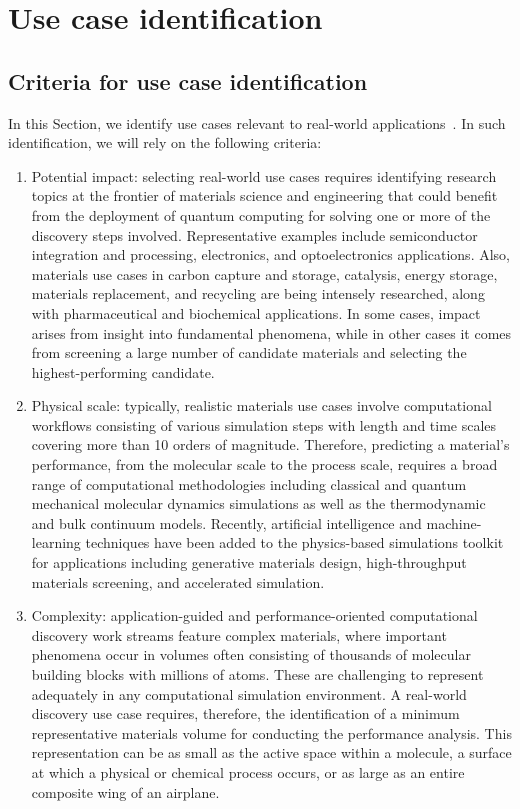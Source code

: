 \section{Use case identification\label{sec:UseCaseDiscovery}}

\subsection{Criteria for use case identification}

In this Section, we identify use cases relevant to real-world applications~\cite{2023arXiv230613126S}.
In such identification, we will rely on the following criteria:

\begin{enumerate}
\item
Potential impact: selecting real-world use cases requires identifying research topics at the frontier of materials science and engineering that could benefit from the deployment of quantum computing for solving one or more of the discovery steps involved. Representative examples include semiconductor integration and processing, electronics, and optoelectronics applications. Also, materials use cases in carbon capture and storage, catalysis, energy storage, materials replacement, and recycling are being intensely researched, along with pharmaceutical and biochemical applications. In some cases, impact arises from insight into fundamental phenomena, while in other cases it comes from screening a large number of candidate materials and selecting the highest-performing candidate.
\item
Physical scale: typically, realistic materials use cases involve computational workflows consisting of various simulation steps with length and time scales covering more than 10 orders of magnitude. Therefore, predicting a material’s performance, from the molecular scale to the process scale, requires a broad range of computational methodologies including classical and quantum mechanical molecular dynamics simulations as well as the thermodynamic and bulk continuum models. Recently, artificial intelligence and machine-learning techniques have been added to the physics-based simulations toolkit for applications including generative materials design, high-throughput materials screening, and accelerated simulation.
\item
Complexity: application-guided and performance-oriented computational discovery work streams feature complex materials, where important phenomena occur in volumes often consisting of thousands of molecular building blocks with millions of atoms.  These are challenging to represent adequately in any computational simulation environment. A real-world discovery use case requires, therefore, the identification of a minimum representative materials volume for conducting the performance analysis. This representation can be as small as the active space within a molecule, a surface at which a physical or chemical process occurs, or as large as an entire composite wing of an airplane.
\end{enumerate}

